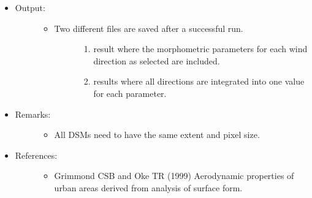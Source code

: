 \documentclass[letterpaper,10pt,english]{sphinxmanual}
\begin{document}
\begin{itemize}
\begin{description}
\begin{itemize}
\end{itemize}

\end{description}

\item {} \begin{description}
\item[{Output:}] \leavevmode\begin{itemize}
\item {} \begin{description}
\item[{Two different files are saved after a successful run.}] \leavevmode\begin{enumerate}
\item {} 
 result where the morphometric parameters for each wind direction as selected are included.

\item {} 
 results where all directions are integrated into one value for each parameter.

\end{enumerate}

\end{description}

\end{itemize}

\end{description}

\item {} \begin{description}
\item[{Remarks:}] \leavevmode\begin{itemize}
\item {} 
All DSMs need to have the same extent and pixel size.

\end{itemize}

\end{description}

\item {} \begin{description}
\item[{References:}] \leavevmode\begin{itemize}
\item {} 
Grimmond CSB and Oke TR (1999) Aerodynamic properties of urban areas derived from analysis of surface form. 

\end{itemize}

\end{description}

\end{itemize}
\end{document}
